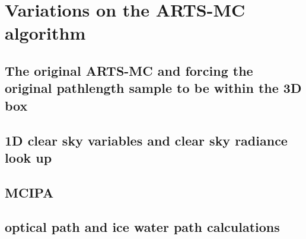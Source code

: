 \section{Variations on the ARTS-MC algorithm}
\subsection{The original ARTS-MC and forcing the original pathlength sample to
be within the 3D box}
\subsection{1D clear sky variables and clear sky radiance look up} 
\subsection{MCIPA}
\subsection{optical path and ice water path calculations}



